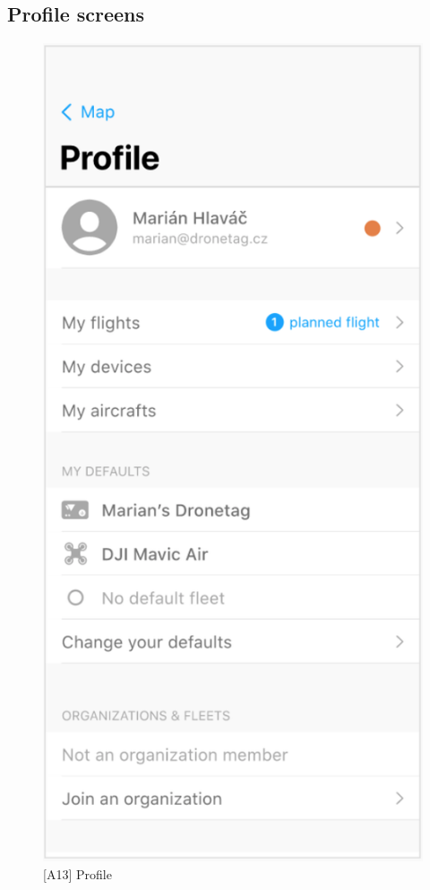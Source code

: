\subsection{Profile screens}\label{subsec:profile-screens}


\begin{figure}
    \centering
    \begin{minipage}{.45\textwidth}
        \centering
        \includegraphics[width=.7\linewidth]{assets/user_interface_design/profile/profile.png}
        \caption{[A13] Profile}
        \label{fig:profile}
    \end{minipage}%
    \hspace{.05\linewidth}
    \begin{minipage}{.45\textwidth}
        \centering

\end{minipage}
\end{figure}
